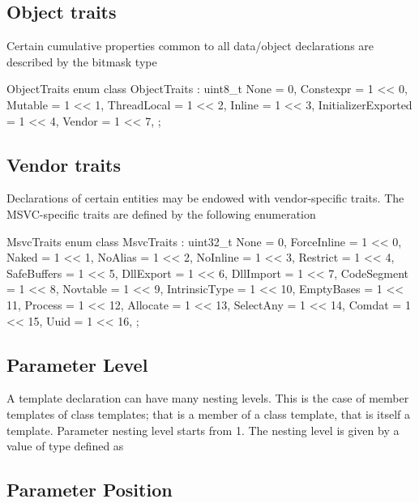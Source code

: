 \subsection{Object traits}
\label{sec:ifc-object-traits}

Certain cumulative properties common to all data/object declarations are described by the bitmask type 
%
\begin{typedef}{ObjectTraits}{}
	enum class ObjectTraits : uint8_t {
		None					= 0,
		Constexpr				= 1 << 0,
		Mutable				= 1 << 1,
		ThreadLocal			= 1 << 2,
		Inline					= 1 << 3,
		InitializerExported	= 1 << 4,
		Vendor					= 1 << 7,
	};
\end{typedef}
%


\subsection{Vendor traits}
\label{sec:ifc-msvc-trait-bitset}

Declarations of certain entities may be endowed with vendor-specific traits.
The MSVC-specific traits are defined by the following enumeration
\begin{typedef}{MsvcTraits}{}
	enum class MsvcTraits : uint32_t {
		None					= 0,
		ForceInline			= 1 << 0,
		Naked					= 1 << 1,
		NoAlias				= 1 << 2,
		NoInline				= 1 << 3,
		Restrict				= 1 << 4,
		SafeBuffers			= 1 << 5,
		DllExport				= 1 << 6,
		DllImport				= 1 << 7,
		CodeSegment			= 1 << 8,
		Novtable				= 1 << 9,
		IntrinsicType			= 1 << 10,
		EmptyBases			= 1 << 11,
		Process				= 1 << 12,
		Allocate				= 1 << 13,
		SelectAny				= 1 << 14,
		Comdat				= 1 << 15,
		Uuid					= 1 << 16,
	};
\end{typedef}

\subsection{Parameter Level}

A template declaration can have many nesting levels.  This is the case of member templates of class templates; that is a member of a class template, that is itself a template.
Parameter nesting level starts from 1.  The nesting level is given by a value of type  defined as

\subsection{Parameter Position}

